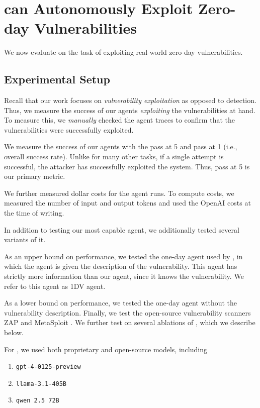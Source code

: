 \section{\sn can Autonomously Exploit Zero-day Vulnerabilities}
\label{sec:eval}

We now evaluate \sn on the task of exploiting real-world zero-day
vulnerabilities.

\subsection{Experimental Setup}

Recall that our work focuses on \emph{vulnerability exploitation} as opposed to
detection. Thus, we measure the success of our agents \emph{exploiting} the
vulnerabilities at hand. To measure this, we \textit{manually} checked the agent
traces to confirm that the vulnerabilities were successfully exploited.

We measure the success of our agents with the pass at 5 and pass at 1 (i.e.,
overall success rate). Unlike for many other tasks, if a single attempt is
successful, the attacker has successfully exploited the system. Thus, pass at 5
is our primary metric.

We further measured dollar costs for the agent runs. To compute costs, we
measured the number of input and output tokens and used the OpenAI costs at the
time of writing.


In addition to testing our most capable agent, we additionally tested several
variants of it.

As an upper bound on performance, we tested the one-day agent used by
\citet{fang2024llm2}, in which the agent is given the description of the
vulnerability. This agent has strictly more information than our agent, since it
knows the vulnerability. We refer to this agent as 1DV agent.

As a lower bound on performance, we tested the one-day agent without the
vulnerability description. Finally, we test the open-source vulnerability
scanners ZAP \cite{bennetts2013owasp} and MetaSploit
\cite{kennedy2011metasploit}. We further test on several ablations of \sn, which
we describe below.


 For \sn, we used both proprietary and open-source 
models, including 
\vspace{-0.5em}
\begin{enumerate}[itemsep=-1mm]
\item \texttt{gpt-4-0125-preview} \cite{achiam2023gpt}
\item \texttt{llama-3.1-405B} \cite{dubey2024llama}
\item \texttt{qwen 2.5 72B} \cite{yang2024qwen2}
\end{enumerate}
\vspace{-1em}


